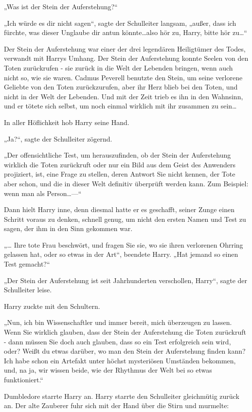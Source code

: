 {„Was ist der Stein der Auferstehung?“

„Ich würde es dir nicht sagen“, sagte der Schulleiter langsam, „außer, dass ich fürchte, was dieser Unglaube dir antun könnte…also hör zu, Harry, bitte hör zu…“

Der Stein der Auferstehung war einer der drei legendären Heiligtümer des Todes, verwandt mit Harrys Umhang. Der Stein der Auferstehung konnte Seelen von den Toten zurückrufen - sie zurück in die Welt der Lebenden bringen, wenn auch nicht so, wie sie waren. Cadmus Peverell benutzte den Stein, um seine verlorene Geliebte von den Toten zurückzurufen, aber ihr Herz blieb bei den Toten, und nicht in der Welt der Lebenden. Und mit der Zeit trieb es ihn in den Wahnsinn, und er tötete sich selbst, um noch einmal wirklich mit ihr zusammen zu sein…

In aller Höflichkeit hob Harry seine Hand.

„Ja?“, sagte der Schulleiter zögernd.

„Der offensichtliche Test, um herauszufinden, ob der Stein der Auferstehung wirklich die Toten zurückruft oder nur ein Bild aus dem Geist des Anwenders projiziert, ist, eine Frage zu stellen, deren Antwort Sie nicht kennen, der Tote aber schon, und die in dieser Welt definitiv überprüft werden kann. Zum Beispiel: wenn man als Person…—“

Dann hielt Harry inne, denn diesmal hatte er es geschafft, seiner Zunge einen Schritt voraus zu denken, schnell genug, um nicht den ersten Namen und Test zu sagen, der ihm in den Sinn gekommen war.

„… Ihre tote Frau beschwört, und fragen Sie sie, wo sie ihren verlorenen Ohrring gelassen hat, oder so etwas in der Art“, beendete Harry. „Hat jemand so einen Test gemacht?“

„Der Stein der Auferstehung ist seit Jahrhunderten verschollen, Harry“, sagte der Schulleiter leise.

Harry zuckte mit den Schultern.

„Nun, ich bin Wissenschaftler und immer bereit, mich überzeugen zu lassen. Wenn Sie wirklich glauben, dass der Stein der Auferstehung die Toten zurückruft - dann müssen Sie doch auch glauben, dass so ein Test erfolgreich sein wird, oder? Weißt du etwas darüber, wo man den Stein der Auferstehung finden kann? Ich habe schon ein Artefakt unter höchst mysteriösen Umständen bekommen, und, na ja, wir wissen beide, wie der Rhythmus der Welt bei so etwas funktioniert.“

Dumbledore starrte Harry an. Harry starrte den Schulleiter gleichmütig zurück an. Der alte Zauberer fuhr sich mit der Hand über die Stirn und murmelte:

}
